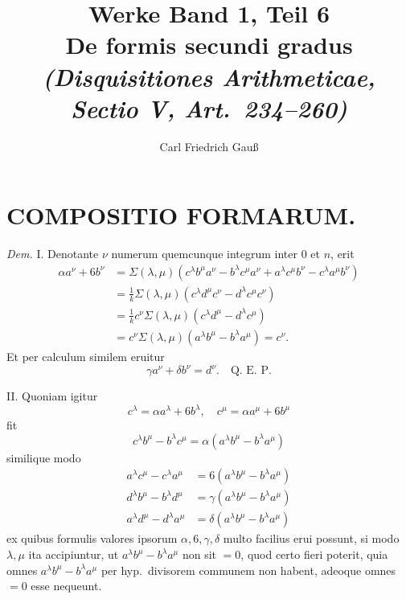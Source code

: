 \documentclass[12pt,a4paper]{article}
\title{Werke Band 1, Teil 6\\[0.5em]\Large De formis secundi gradus\\\normalsize\textit{(Disquisitiones Arithmeticae, Sectio V, Art.\ 234--260)}}
\author{Carl Friedrich Gau\ss{}}
\date{}
\theoremstyle{plain}
\theoremstyle{definition}
\theoremstyle{remark}
\begin{document}
\maketitle


\section*{COMPOSITIO FORMARUM.}


\textit{Dem.} I. Denotante $\nu$ numerum quemcunque integrum inter $0$ et $n$, erit
\begin{align*}
\alpha a^{\nu} + 6b^{\nu} &= \Sigma(\lambda, \mu)(c^{\lambda}b^{\mu}a^{\nu} - b^{\lambda}c^{\mu}a^{\nu} + a^{\lambda}c^{\mu}b^{\nu} - c^{\lambda}a^{\mu}b^{\nu}) \\
&= \tfrac{1}{k}\Sigma(\lambda, \mu)(c^{\lambda}d^{\mu}c^{\nu} - d^{\lambda}c^{\mu}c^{\nu}) \\
&= \tfrac{1}{k}c^{\nu}\Sigma(\lambda, \mu)(c^{\lambda}d^{\mu} - d^{\lambda}c^{\mu}) \\
&= c^{\nu}\Sigma(\lambda, \mu)(a^{\lambda}b^{\mu} - b^{\lambda}a^{\mu}) = c^{\nu}.
\end{align*}
Et per calculum similem eruitur
\[
\gamma a^{\nu} + \delta b^{\nu} = d^{\nu}. \quad \text{Q.\ E.\ P.}
\]

II. Quoniam igitur
\[
c^{\lambda} = \alpha a^{\lambda} + 6b^{\lambda}, \quad c^{\mu} = \alpha a^{\mu} + 6b^{\mu}
\]
fit
\[
c^{\lambda}b^{\mu} - b^{\lambda}c^{\mu} = \alpha(a^{\lambda}b^{\mu} - b^{\lambda}a^{\mu})
\]
similique modo
\begin{align*}
a^{\lambda}c^{\mu} - c^{\lambda}a^{\mu} &= 6(a^{\lambda}b^{\mu} - b^{\lambda}a^{\mu}) \\
d^{\lambda}b^{\mu} - b^{\lambda}d^{\mu} &= \gamma(a^{\lambda}b^{\mu} - b^{\lambda}a^{\mu}) \\
a^{\lambda}d^{\mu} - d^{\lambda}a^{\mu} &= \delta(a^{\lambda}b^{\mu} - b^{\lambda}a^{\mu})
\end{align*}
ex quibus formulis valores ipsorum $\alpha, 6, \gamma, \delta$ multo facilius erui possunt, si modo $\lambda, \mu$ ita accipiuntur, ut $a^{\lambda}b^{\mu} - b^{\lambda}a^{\mu}$ non sit $= 0$, quod certo fieri poterit, quia omnes $a^{\lambda}b^{\mu} - b^{\lambda}a^{\mu}$ per hyp.\ divisorem communem non habent, adeoque omnes $= 0$ esse nequeunt.
\end{document}
